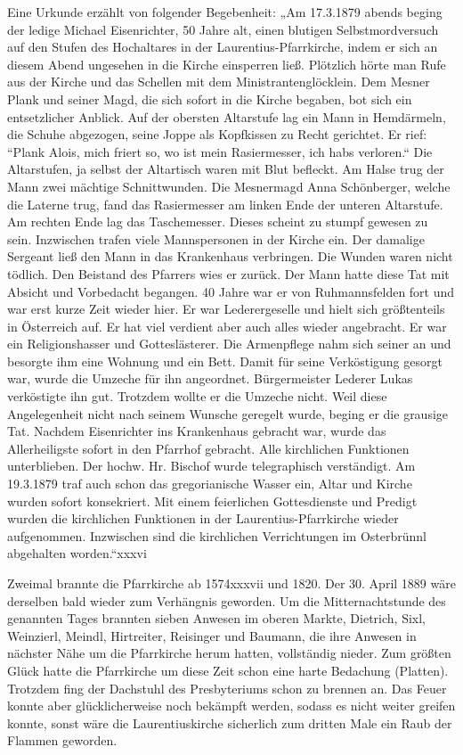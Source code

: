 \documentclass[12pt,a4paper]{book}
\begin{document}
Eine Urkunde erzählt von folgender Begebenheit: „Am 17.3.1879 abends beging der
ledige Michael Eisenrichter, 50 Jahre alt, einen blutigen Selbstmordversuch auf
den Stufen des Hochaltares in der Laurentius-Pfarrkirche, indem er sich an
diesem Abend ungesehen in die Kirche einsperren ließ. Plötzlich hörte man Rufe
aus der Kirche und das Schellen mit dem Ministrantenglöcklein. Dem Mesner Plank
und seiner Magd, die sich sofort in die Kirche begaben, bot sich ein
entsetzlicher Anblick. Auf der obersten Altarstufe lag ein Mann in Hemdärmeln,
die Schuhe abgezogen, seine Joppe als Kopfkissen zu Recht gerichtet. Er rief:
“Plank Alois, mich friert so, wo ist mein Rasiermesser, ich habs verloren.“ Die
Altarstufen, ja selbst der Altartisch waren mit Blut befleckt. Am Halse trug der
Mann zwei mächtige Schnittwunden. Die Mesnermagd Anna Schönberger, welche die
Laterne trug, fand das Rasiermesser am linken Ende der unteren Altarstufe. Am
rechten Ende lag das Taschemesser. Dieses scheint zu stumpf gewesen zu sein.
Inzwischen trafen viele Mannspersonen in der Kirche ein. Der damalige Sergeant
ließ den Mann in das Krankenhaus verbringen. Die Wunden waren nicht tödlich. Den
Beistand des Pfarrers wies er zurück. Der Mann hatte diese Tat mit Absicht und
Vorbedacht begangen. 40 Jahre war er von Ruhmannsfelden fort und war erst kurze
Zeit wieder hier. Er war Lederergeselle und hielt sich größtenteils in
Österreich auf. Er hat viel verdient aber auch alles wieder angebracht. Er war
ein Religionshasser und Gotteslästerer. Die Armenpflege nahm sich seiner an und
besorgte ihm eine Wohnung und ein Bett. Damit für seine Verköstigung gesorgt
war, wurde die Umzeche für ihn angeordnet. Bürgermeister Lederer Lukas
verköstigte ihn gut. Trotzdem wollte er die Umzeche nicht. Weil diese
Angelegenheit nicht nach seinem Wunsche geregelt wurde, beging er die grausige
Tat. Nachdem Eisenrichter ins Krankenhaus gebracht war, wurde das Allerheiligste
sofort in den Pfarrhof gebracht. Alle kirchlichen Funktionen unterblieben. Der
hochw. Hr. Bischof wurde telegraphisch verständigt. Am 19.3.1879 traf auch schon
das gregorianische Wasser ein, Altar und Kirche wurden sofort konsekriert. Mit
einem feierlichen Gottesdienste und Predigt wurden die kirchlichen Funktionen in
der Laurentius-Pfarrkirche wieder aufgenommen. Inzwischen sind die kirchlichen
Verrichtungen im Osterbrünnl abgehalten worden.“xxxvi

Zweimal brannte die Pfarrkirche ab 1574xxxvii und 1820. Der 30. April 1889 wäre
derselben bald wieder zum Verhängnis geworden. Um die Mitternachtstunde des
genannten Tages brannten sieben Anwesen im oberen Markte, Dietrich, Sixl,
Weinzierl, Meindl, Hirtreiter, Reisinger und Baumann, die ihre Anwesen in
nächster Nähe um die Pfarrkirche herum hatten, vollständig nieder. Zum größten
Glück hatte die Pfarrkirche um diese Zeit schon eine harte Bedachung (Platten).
Trotzdem fing der Dachstuhl des Presbyteriums schon zu brennen an. Das Feuer
konnte aber glücklicherweise noch bekämpft werden, sodass es nicht weiter
greifen konnte, sonst wäre die Laurentiuskirche sicherlich zum dritten Male ein
Raub der Flammen geworden.
\end{document}
